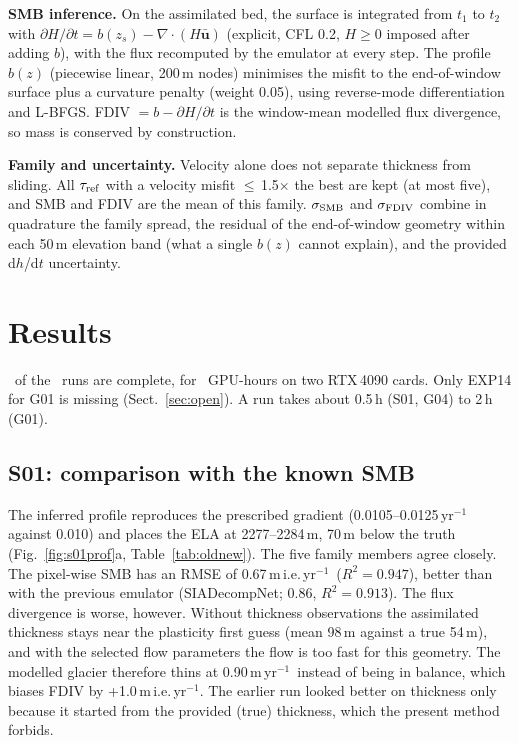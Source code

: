 \documentclass[10pt,a4paper]{article}
\newcommand{\myr}{m\,yr$^{-1}$}
\newcommand{\mie}{m\,i.e.\,yr$^{-1}$}
\begin{document}
\textbf{SMB inference.} On the assimilated bed, the surface is integrated from $t_1$ to $t_2$ with
$\partial H/\partial t=b(z_s)-\nabla\!\cdot(H\bar{\mathbf u})$ (explicit, CFL 0.2, $H\ge0$ imposed after adding $b$),
with the flux recomputed by the emulator at every step. The profile $b(z)$ (piecewise linear, 200\,m nodes) minimises
the misfit to the end-of-window surface plus a curvature penalty (weight 0.05), using reverse-mode differentiation and
L-BFGS. FDIV $=b-\partial H/\partial t$ is the window-mean modelled flux divergence, so mass is conserved by construction.

\textbf{Family and uncertainty.} Velocity alone does not separate thickness from sliding. All $\tau_{\rm ref}$ with a
velocity misfit $\le$\,1.5$\times$ the best are kept (at most five), and SMB and FDIV are the mean of this family.
$\sigma_{\rm SMB}$ and $\sigma_{\rm FDIV}$ combine in quadrature the family spread, the residual of the end-of-window
geometry within each 50\,m elevation band (what a single $b(z)$ cannot explain), and the provided d$h$/d$t$ uncertainty.

\section{Results}
\NDone\ of the \NQueue\ runs are complete, for \LaneHours\ GPU-hours on two RTX\,4090 cards. Only EXP14 for G01 is missing
(Sect.~\ref{sec:open}). A run takes about 0.5\,h (S01, G04) to 2\,h (G01).

\subsection{S01: comparison with the known SMB}
The inferred profile reproduces the prescribed gradient (0.0105--0.0125\,yr$^{-1}$ against 0.010) and places the ELA at
2277--2284\,m, 70\,m below the truth (Fig.~\ref{fig:s01prof}a, Table~\ref{tab:oldnew}). The five family members agree
closely. The pixel-wise SMB has an RMSE of 0.67\,\mie\ ($R^2=0.947$), better than with the previous emulator
(SIADecompNet; 0.86, $R^2=0.913$). The flux divergence is worse, however. Without thickness observations the
assimilated thickness stays near the plasticity first guess (mean 98\,m against a true 54\,m), and with the
selected flow parameters the flow is too fast for this geometry. The modelled glacier therefore thins at
0.90\,\myr\ instead of being in balance, which biases FDIV by +1.0\,\mie. The earlier run looked better on thickness
only because it started from the provided (true) thickness, which the present method forbids.
\end{document}
